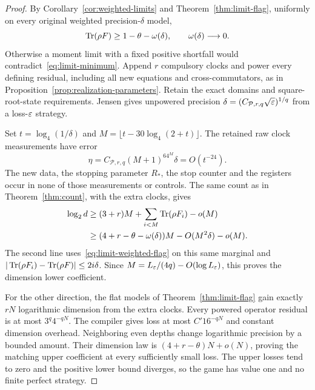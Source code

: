 \begin{proof}
By Corollary~\ref{cor:weighted-limits} and Theorem~\ref{thm:limit-flag}, uniformly on every original weighted precision-$\delta$ model,
\begin{equation}\label{eq:limit-weighted-flag}
 \operatorname{Tr}(\rho F)\ge1-\theta-\omega(\delta),\qquad \omega(\delta)\longrightarrow0.
\end{equation}
Otherwise a moment limit with a fixed positive shortfall would contradict~\eqref{eq:limit-minimum}. Append $r$ compulsory clocks and power every defining residual, including all new equations and cross-commutators, as in Proposition~\ref{prop:realization-parameters}. Retain the exact domains and square-root-state requirements. Jensen gives unpowered precision $\delta=(C_{\mathcal P,r,q}\sqrt{\varepsilon})^{1/q}$ from a loss-$\varepsilon$ strategy.

Set $t=\log_4(1/\delta)$ and $M=\lfloor t-30\log_4(2+t)\rfloor$. The retained raw clock measurements have error
\[
 \eta=C_{\mathcal P,r,q}(M+1)^64^M\delta=O(t^{-24}).
\]
The new data, the stopping parameter $R_*$, the stop counter and the registers occur in none of those measurements or controls. The same count as in Theorem~\ref{thm:count}, with the extra clocks, gives
\begin{align*}
 \log_2d&\ge(3+r)M+\sum_{i<M}\operatorname{Tr}(\rho F_i)-o(M)\\
 &\ge(4+r-\theta-\omega(\delta))M-O(M^2\delta)-o(M).
\end{align*}
The second line uses~\eqref{eq:limit-weighted-flag} on this same marginal and $|\operatorname{Tr}(\rho F_i)-\operatorname{Tr}(\rho F)|\le2i\delta$. Since $M=L_\varepsilon/(4q)-O(\log L_\varepsilon)$, this proves the dimension lower coefficient.

For the other direction, the flat models of Theorem~\ref{thm:limit-flag} gain exactly $rN$ logarithmic dimension from the extra clocks. Every powered operator residual is at most $3^q4^{-qN}$. The compiler gives loss at most $C'16^{-qN}$ and constant dimension overhead. Neighboring even depths change logarithmic precision by a bounded amount. Their dimension law is $(4+r-\theta)N+o(N)$, proving the matching upper coefficient at every sufficiently small loss. The upper losses tend to zero and the positive lower bound diverges, so the game has value one and no finite perfect strategy.


\end{proof}
